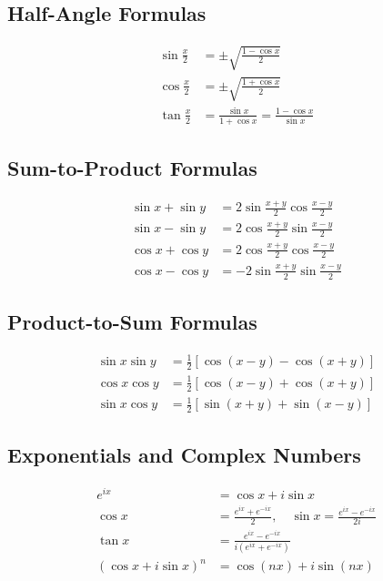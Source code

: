 \documentclass[10pt, letterpaper]{report}
\begin{document}
\subsection*{Half-Angle Formulas}
\begin{align*}
\sin\frac{x}{2} &= \pm\sqrt{\frac{1 - \cos x}{2}} \\
\cos\frac{x}{2} &= \pm\sqrt{\frac{1 + \cos x}{2}} \\
\tan\frac{x}{2} &= \frac{\sin x}{1+\cos x} = \frac{1-\cos x}{\sin x}
\end{align*}

\subsection*{Sum-to-Product Formulas}
\begin{align*}
\sin x + \sin y &= 2 \sin\frac{x + y}{2}\cos\frac{x - y}{2} \\
\sin x - \sin y &= 2 \cos\frac{x + y}{2}\sin\frac{x - y}{2} \\
\cos x + \cos y &= 2 \cos\frac{x + y}{2}\cos\frac{x - y}{2} \\
\cos x - \cos y &= -2 \sin\frac{x + y}{2}\sin\frac{x - y}{2}
\end{align*}

\subsection*{Product-to-Sum Formulas}
\begin{align*}
\sin x \sin y &= \frac{1}{2}[\cos(x - y) - \cos(x + y)] \\
\cos x \cos y &= \frac{1}{2}[\cos(x - y) + \cos(x + y)] \\
\sin x \cos y &= \frac{1}{2}[\sin(x + y) + \sin(x - y)]
\end{align*}

\subsection*{Exponentials and Complex Numbers}
\begin{align*}
e^{ix} &= \cos x + i\sin x \\
\cos x &= \frac{e^{ix}+e^{-ix}}{2},\quad \sin x = \frac{e^{ix}-e^{-ix}}{2i} \\
\tan x &= \frac{e^{ix}-e^{-ix}}{i(e^{ix}+e^{-ix})}\\[8pt]
(\cos x + i\sin x)^n &= \cos(nx) + i\sin(nx)
\end{align*}
\end{document}
